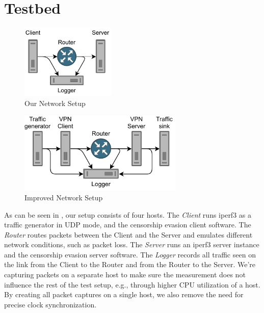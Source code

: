 \section{Testbed}
\begin{figure}[tbh]
	\centering
	\includegraphics[draft=false,width=0.4\textwidth]{figures/Network schematic/actual/setup.pdf}
	\caption{Our Network Setup}
	\label{fig:actual_network_schematic}
\end{figure}
\begin{figure}[tbh]
	\centering
	\includegraphics[draft=false,width=0.7\textwidth]{figures/Network schematic/optimal/setup.pdf}
	\caption{Improved Network Setup}
	\label{fig:optimal_network_schematic}
\end{figure}

As can be seen in , our setup consists of four hosts.
The \textit{Client} runs iperf3 as a traffic generator in UDP mode, and the censorship evasion client software.
The \textit{Router} routes packets between the Client and the Server and emulates different network conditions, such as packet loss.
The \textit{Server} runs an iperf3 server instance and the censorship evasion server software.
The \textit{Logger} records all traffic seen on the link from the Client to the Router and from the Router to the Server.
We're capturing packets on a separate host to make sure the measurement does not influence the rest of the test setup, e.g., through higher CPU utilization of a host.
By creating all packet captures on a single host, we also remove the need for precise clock synchronization.

